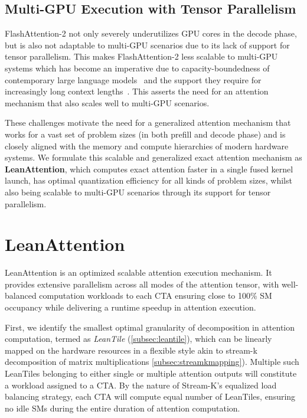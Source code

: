 \subsection{Multi-GPU Execution with Tensor Parallelism} FlashAttention-2 not only severely underutilizes GPU cores in the decode phase, but is also not adaptable to multi-GPU scenarios due to its lack of support for tensor parallelism. This makes FlashAttention-2 less scalable to multi-GPU systems which has become an imperative due to capacity-boundedness of contemporary large language models~\cite{brown2020language} and the support they require for increasingly long context lengths~\cite{claude3}. This asserts the need for an attention mechanism that also scales well to multi-GPU scenarios.

These challenges motivate the need for a generalized attention mechanism that works for a vast set of problem sizes (in both prefill and decode phase) and is closely aligned with the memory and compute hierarchies of modern hardware systems. We formulate this scalable and generalized exact attention mechanism as \textbf{LeanAttention}, which computes exact attention faster in a single fused kernel launch, has optimal quantization efficiency for all kinds of problem sizes, whilst also being scalable to multi-GPU scenarios through its support for tensor parallelism.

\section{LeanAttention}
\label{sec:Method}

LeanAttention is an optimized scalable attention execution mechanism. It provides extensive parallelism across all modes of the attention tensor, with well-balanced computation workloads to each CTA ensuring close to 100\% SM occupancy while delivering a runtime speedup in attention execution.

First, we identify the smallest optimal granularity of decomposition in attention computation, termed as \textit{LeanTile} (\autoref{subsec:leantile}), which can be linearly mapped on the hardware resources in a flexible style akin to stream-k decomposition of matrix multiplications \autoref{subsec:streamkmapping}). Multiple such LeanTiles belonging to either single or multiple attention outputs will constitute a workload assigned to a CTA. By the nature of Stream-K's equalized load balancing strategy, each CTA will compute equal number of LeanTiles, ensuring no idle SMs during the entire duration of attention computation.

